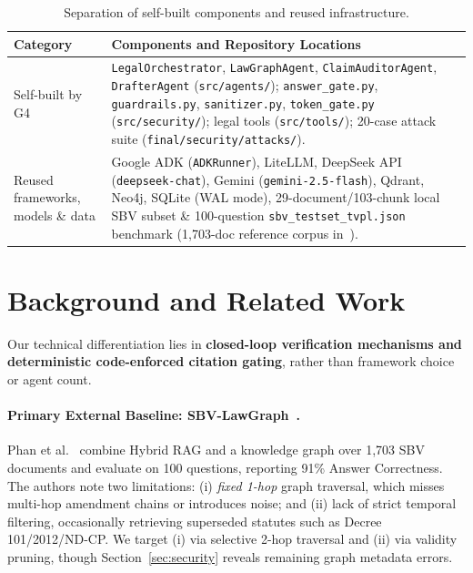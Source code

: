 \documentclass[sigconf,nonacm]{acmart}
\begin{document}
\begin{table}[t]
\caption{Separation of self-built components and reused infrastructure.}
\label{tab:ownership}
\footnotesize
\begin{tabular}{@{}p{2.3cm}p{5.7cm}@{}}
\toprule
\textbf{Category} & \textbf{Components and Repository Locations} \\
\midrule
Self-built by G4 & \texttt{LegalOrchestrator}, \texttt{LawGraphAgent}, \texttt{ClaimAuditorAgent}, \texttt{DrafterAgent} (\texttt{src/agents/}); \texttt{answer\_gate.py}, \texttt{guardrails.py}, \texttt{sanitizer.py}, \texttt{token\_gate.py} (\texttt{src/security/}); legal tools (\texttt{src/tools/}); 20-case attack suite (\texttt{final/security/attacks/}). \\
\midrule
Reused frameworks, models \& data & Google ADK (\texttt{ADKRunner}), LiteLLM, DeepSeek API (\texttt{deepseek-chat}), Gemini (\texttt{gemini-2.5-flash}), Qdrant, Neo4j, SQLite (WAL mode), 29-document/103-chunk local SBV subset \& 100-question \texttt{sbv\_testset\_tvpl.json} benchmark (1,703-doc reference corpus in~\cite{phan2026sbv}). \\
\bottomrule
\end{tabular}
\end{table}

\section{Background and Related Work}
\label{sec:related}

Our technical differentiation lies in \textbf{closed-loop verification mechanisms and deterministic code-enforced citation gating}, rather than framework choice or agent count.

\paragraph{Primary External Baseline: SBV-LawGraph~\cite{phan2026sbv}.}
Phan et al.~\cite{phan2026sbv} combine Hybrid RAG and a knowledge graph over 1,703 SBV documents and evaluate on 100 questions, reporting 91\% Answer Correctness. The authors note two limitations: (i) \emph{fixed 1-hop} graph traversal, which misses multi-hop amendment chains or introduces noise; and (ii) lack of strict temporal filtering, occasionally retrieving superseded statutes such as Decree 101/2012/ND-CP. We target (i) via selective 2-hop traversal and (ii) via validity pruning, though Section~\ref{sec:security} reveals remaining graph metadata errors.
\end{document}
